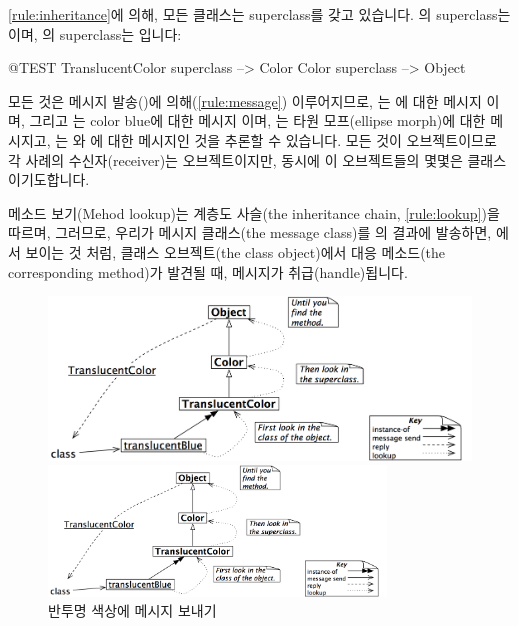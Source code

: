 \documentclass[a4paper,10pt,twoside]{book}
\begin{document}
\ref{rule:inheritance}에 의해, 모든 클래스는 superclass를 갖고 있습니다. 
의 superclass는 이며, 의 superclass는 입니다:
\begin{code}{@TEST}
TranslucentColor superclass --> Color
Color superclass                   --> Object
\end{code}
모든 것은 메시지 발송()에 의해(\ref{rule:message}) 이루어지므로, 는 에 대한 메시지 이며,  그리고 는 color blue에 대한 메시지 이며, 는 타원 모프(ellipse morph)에 대한 메시지고, 는 와 에 대한 메시지인 것을 추론할 수 있습니다. 
모든 것이 오브젝트이므로 각 사례의 수신자(receiver)는 오브젝트이지만, 동시에 이 오브젝트들의 몇몇은 클래스 이기도합니다.

메소드 보기(Mehod lookup)는 계층도 사슬(the inheritance chain, \ref{rule:lookup})을 따르며, 그러므로, 우리가 메시지 클래스(the message class)를 의 결과에 발송하면, 에서 보이는 것 처럼, 클래스 오브젝트(the class object)에서 대응 메소드(the corresponding method)가 발견될 때, 메시지가 취급(handle)됩니다. 

\begin{center}
\begin{figure}[!ht]
\ifluluelse
	{\centerline{\includegraphics[width=\textwidth]{TranslucentClassMessage}}}
	{\centerline{\includegraphics[width=0.8\textwidth]{TranslucentClassMessage}}}
\caption{반투명 색상에 메시지 보내기 \label{fig:classmessage}}
\end{figure}
\end{center}
\end{document}
